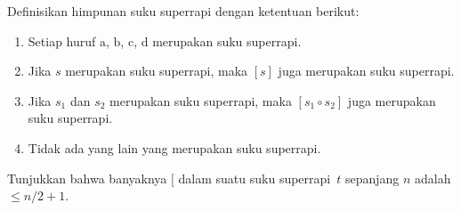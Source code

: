 \documentclass[../../../include/open-logic-section]{subfiles}
\begin{document}
\begin{prob}
  Definisikan himpunan suku superrapi dengan ketentuan berikut:
  \begin{enumerate}
  \item Setiap huruf $\mathrm{a}$, $\mathrm{b}$, $\mathrm{c}$,
    $\mathrm{d}$ merupakan suku superrapi.
  \item Jika $s$ merupakan suku superrapi, maka $[s]$ juga merupakan suku
    superrapi.
  \item Jika $s_1$ dan $s_2$ merupakan suku superrapi, maka
    $[s_1 \circ s_2]$ juga merupakan suku superrapi.
  \item Tidak ada yang lain yang merupakan suku superrapi.
  \end{enumerate}
  Tunjukkan bahwa banyaknya $[$ dalam suatu suku superrapi~$t$ sepanjang
  $n$ adalah $\le n/2 +1$.
\end{prob}
\end{document}
